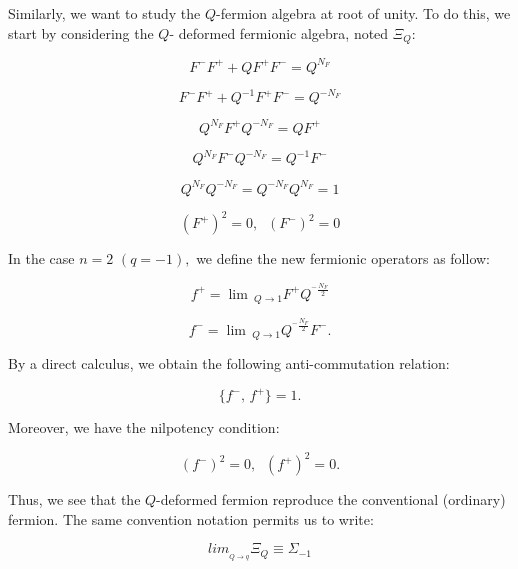 \documentclass[a4paper,12pt,thmsa]{article}
\begin{document}
Similarly, we want to study the $Q$-fermion algebra at root of unity. To do
this, we start by considering the $Q$- deformed fermionic algebra, noted $%
\Xi _Q$:

\begin{equation}
F^{-}F^{+}+QF^{+}F^{-}=Q^{N_{F}}
\end{equation}

\begin{equation}
F^{-}F^{+}+Q^{-1}F^{+}F^{-}=Q^{-N_F}
\end{equation}

\begin{equation}
Q^{N_F}F^{+}Q^{-N_F}=QF^{+}
\end{equation}

\begin{equation}
Q^{N_F}F^{-}Q^{-N_F}=Q^{-1}F^{-}
\end{equation}

\begin{equation}
Q^{N_F}Q^{-N_F}=Q^{-N_F}Q^{N_F}=1
\end{equation}

\begin{equation}
(F^{+})^2=0, \; \; (F^{-})^2=0
\end{equation}

In the case $n=2$ $(q=-1),$ we define the new fermionic operators as follow:

\begin{equation}
f^{+}=\lim \, _{Q\rightarrow 1}F^{+}Q^{^{-}\frac{N_F}2}
\end{equation}

\begin{equation}
f^{-}=\lim \, _{Q\rightarrow 1}Q^{^{-}\frac{N_F}2}F^{-}.
\end{equation}

By a direct calculus, we obtain the following anti-commutation relation:

\begin{equation}
\{f^{-},\, f^{+}\}=1.
\end{equation}

Moreover, we have the nilpotency condition:

\begin{equation}
(f^{-})^2=0, \;\;(f^{+})^2=0.
\end{equation}

Thus, we see that the $Q$-deformed fermion reproduce the conventional
(ordinary) fermion. The same convention notation permits us to write:

\[
lim_{_{Q\rightarrow q}}\Xi _Q\equiv \Sigma _{-1}
\]
\end{document}
